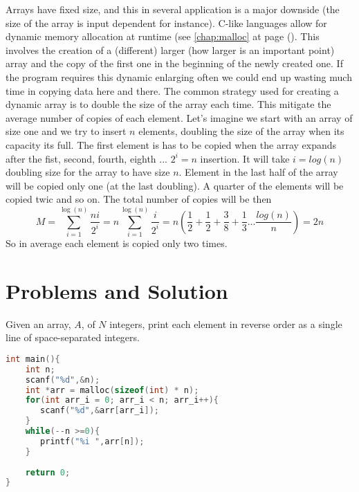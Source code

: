 Arrays have fixed size, and this in several application is a major downside (the size of the array is input dependent for instance). C-like languages allow for dynamic memory allocation at runtime (see \ref{chap:malloc} at page (). This involves the creation of a (different) larger (how larger is an important point) array and the copy of the first one in the beginning of the newly created one. If the program requires this dynamic enlarging often we could end up wasting much time in copying data here and there.
The common strategy used for creating a dynamic array is to double the size of the array each time. This mitigate the average number of copies of each element. Let's imagine we start with an array of size one and we try to insert $n$ elements, doubling the size of the array when its capacity its full. The first element is has to be copied when the array expands after the fist, second, fourth, eighth ... $2^i = n$ insertion.
It will take $i = log(n)$ doubling size for the array to have size $n$. Element in the last half of the array will be copied only one (at the last doubling). A quarter of the elements will be copied twic and so on. The total number of copies will be then
\[
M = \sum_{i=1}^{\log(n)} \frac{ni}{2^i} = n\sum_{i=1}^{\log(n)} \frac{i}{2^i} = n(\frac{1}{2}+\frac{1}{2} + \frac{3}{8} + \frac{1}{3} ... \frac{log(n)}{n})=2n
\]
So in average  each element is copied only two times.

 \section{Problems and Solution}
 


\begin{problem}
Given an array, $A$, of $N$ integers, print each element in reverse order as a single line of space-separated integers.
\end{problem}	

\begin{solution}

		\begin{lstlisting}[language=C, caption="C"]
        int main(){
    int n; 
    scanf("%d",&n);
    int *arr = malloc(sizeof(int) * n);
    for(int arr_i = 0; arr_i < n; arr_i++){
       scanf("%d",&arr[arr_i]);
    }
    while(--n >=0){
       printf("%i ",arr[n]);
    }
    
    return 0;
}

		\end{lstlisting}  

\end{solution}	
 
